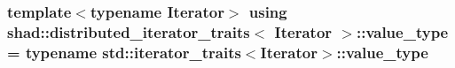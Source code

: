 \hypertarget{structshad_1_1distributed__iterator__traits_a67d1c97f6cfbb30068ed30d5fd5ef2bc}{
\subsubsection[{value\-\_\-type}]{\setlength{\rightskip}{0pt plus 5cm}template$<$typename Iterator$>$ using {\bf shad\-::distributed\-\_\-iterator\-\_\-traits}$<$ Iterator $>$\-::{\bf value\-\_\-type} =  typename std\-::iterator\-\_\-traits$<$Iterator$>$\-::{\bf value\-\_\-type}}}\label{structshad_1_1distributed__iterator__traits_a67d1c97f6cfbb30068ed30d5fd5ef2bc}


